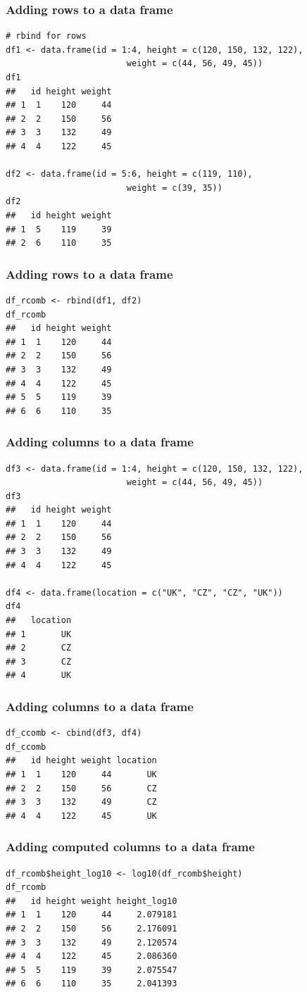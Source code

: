 \documentclass{beamer}
\newcommand{\bfr}[1]{\begin{frame}[fragile]\frametitle{{ #1 }}}
\begin{document}
\bfr{Adding rows to a data frame}
\begin{verbatim}
# rbind for rows
df1 <- data.frame(id = 1:4, height = c(120, 150, 132, 122),
                        weight = c(44, 56, 49, 45))
df1
##   id height weight
## 1  1    120     44
## 2  2    150     56
## 3  3    132     49
## 4  4    122     45

df2 <- data.frame(id = 5:6, height = c(119, 110),
                        weight = c(39, 35))
df2
##   id height weight
## 1  5    119     39
## 2  6    110     35
\end{verbatim}
\end{frame}

\bfr{Adding rows to a data frame}
\begin{verbatim}
df_rcomb <- rbind(df1, df2)
df_rcomb
##   id height weight
## 1  1    120     44
## 2  2    150     56
## 3  3    132     49
## 4  4    122     45
## 5  5    119     39
## 6  6    110     35
\end{verbatim}
\end{frame}


\bfr{Adding columns to a data frame}
\begin{verbatim}
df3 <- data.frame(id = 1:4, height = c(120, 150, 132, 122),
                        weight = c(44, 56, 49, 45))
df3
##   id height weight
## 1  1    120     44
## 2  2    150     56
## 3  3    132     49
## 4  4    122     45

df4 <- data.frame(location = c("UK", "CZ", "CZ", "UK"))
df4
##   location
## 1       UK
## 2       CZ
## 3       CZ
## 4       UK
\end{verbatim}
\end{frame}


\bfr{Adding columns to a data frame}
\begin{verbatim}
df_ccomb <- cbind(df3, df4)
df_ccomb
##   id height weight location
## 1  1    120     44       UK
## 2  2    150     56       CZ
## 3  3    132     49       CZ
## 4  4    122     45       UK
\end{verbatim}
\end{frame}

\bfr{Adding computed columns to a data frame}
\begin{verbatim}
df_rcomb$height_log10 <- log10(df_rcomb$height)
df_rcomb
##   id height weight height_log10
## 1  1    120     44     2.079181
## 2  2    150     56     2.176091
## 3  3    132     49     2.120574
## 4  4    122     45     2.086360
## 5  5    119     39     2.075547
## 6  6    110     35     2.041393
\end{verbatim}
\end{frame}
\end{document}
